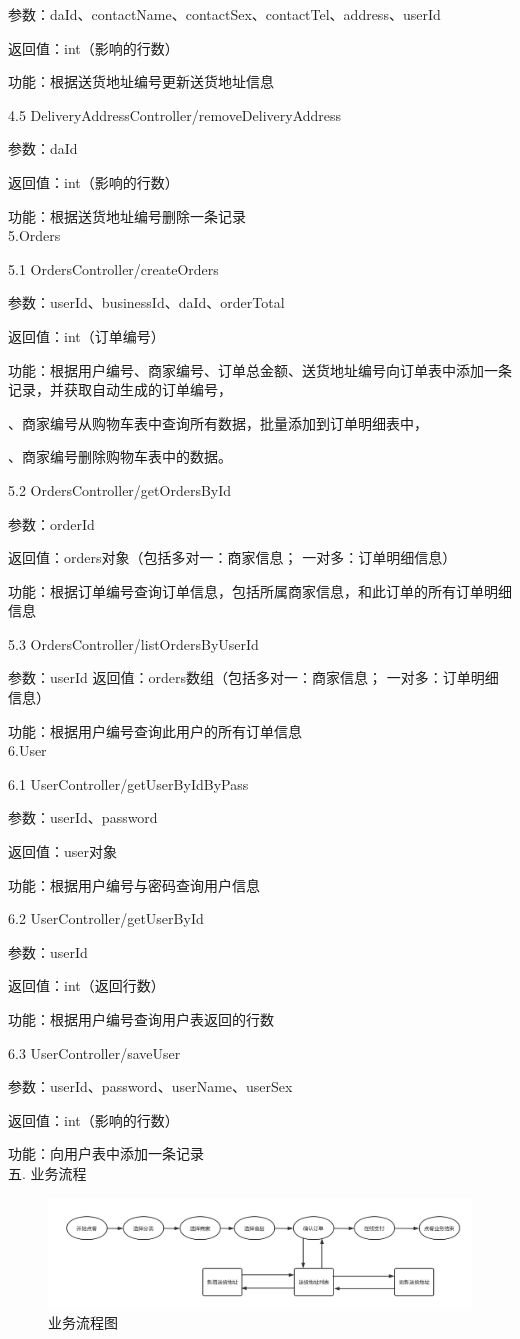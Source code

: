 参数：daId、contactName、contactSex、contactTel、address、userId 

返回值：int（影响的行数） 

功能：根据送货地址编号更新送货地址信息

4.5 DeliveryAddressController/removeDeliveryAddress 

参数：daId 

返回值：int（影响的行数） 

功能：根据送货地址编号删除一条记录 ~\\

5.Orders 

5.1 OrdersController/createOrders 

参数：userId、businessId、daId、orderTotal 

返回值：int（订单编号） 

功能：根据用户编号、商家编号、订单总金额、送货地址编号向订单表中添加一条记录，并获取自动生成的订单编号， 

\qquad{}、商家编号从购物车表中查询所有数据，批量添加到订单明细表中， 

\qquad{}、商家编号删除购物车表中的数据。 

5.2 OrdersController/getOrdersById 

参数：orderId 

返回值：orders对象（包括多对一：商家信息； 一对多：订单明细信息） 

功能：根据订单编号查询订单信息，包括所属商家信息，和此订单的所有订单明细信息 

5.3 OrdersController/listOrdersByUserId 

参数：userId 返回值：orders数组（包括多对一：商家信息； 一对多：订单明细信息） 

功能：根据用户编号查询此用户的所有订单信息~\\ 

6.User 

6.1 UserController/getUserByIdByPass 

参数：userId、password 

返回值：user对象 

功能：根据用户编号与密码查询用户信息 

6.2 UserController/getUserById 

参数：userId 

返回值：int（返回行数） 

功能：根据用户编号查询用户表返回的行数 

6.3 UserController/saveUser 

参数：userId、password、userName、userSex 

返回值：int（影响的行数） 

功能：向用户表中添加一条记录 ~\\

\noindent
五. 业务流程

\begin{figure}[H]
    \centering
    \includegraphics[scale=0.45]{figures/flowchart.png}
    \caption{业务流程图}
\end{figure}